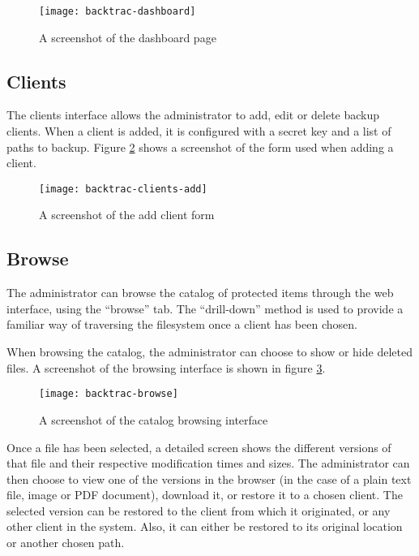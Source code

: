 \begin{figure}
    \begin{center}
        \texttt{[image: backtrac-dashboard]}
    \end{center}
    \caption{A screenshot of the dashboard page}
    \label{fig:backtrac-dashboard}
\end{figure}

\subsection{Clients}
\label{sec:implementation-web-clients}

The clients interface allows the administrator to add, edit or delete backup
clients. When a client is added, it is configured with a secret key and a list
of paths to backup. Figure \ref{fig:backtrac-clients-add} shows a screenshot of
the form used when adding a client.

\begin{figure}[h]
    \begin{center}
        \texttt{[image: backtrac-clients-add]}
    \end{center}
    \caption{A screenshot of the add client form}
    \label{fig:backtrac-clients-add}
\end{figure}

\subsection{Browse}
\label{sec:implementation-web-browse}

The administrator can browse the catalog of protected items through the web
interface, using the ``browse'' tab. The ``drill-down'' method is used to
provide a familiar way of traversing the filesystem once a client has been
chosen.

When browsing the catalog, the administrator can choose to show or hide deleted
files. A screenshot of the browsing interface is shown in figure
\ref{fig:backtrac-browse}.

\begin{figure}[h]
    \begin{center}
        \texttt{[image: backtrac-browse]}
    \end{center}
    \caption{A screenshot of the catalog browsing interface}
    \label{fig:backtrac-browse}
\end{figure}

Once a file has been selected, a detailed screen shows the different versions
of that file and their respective modification times and sizes. The
administrator can then choose to view one of the versions in the browser (in
the case of a plain text file, image or PDF document), download it, or restore
it to a chosen client. The selected version can be restored to the client from
which it originated, or any other client in the system. Also, it can either be
restored to its original location or another chosen path.

